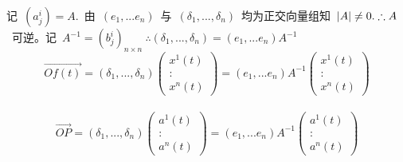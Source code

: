 记\ $(a_j^i)=A.$\ 由\ $(e_1,...e_n)$\ 与\ $(\delta_1,...,\delta_n)$\ 均为正交向量组知\  $|A|\neq 0.
\\
\therefore A$\ 可逆。记\ $A^{-1}=(b_j^i)_{n\times n}\ \therefore (\delta_1,...,\delta_n)=(e_1,...e_n)A^{-1}$
$$\overrightarrow{Of(t)}=(\delta_1,...,\delta_n)
                                           \left(        \begin{array}{c}
                                          x^1(t)
                                          \\
                                          \colon
                                          \\
                                          x^n(t)   
                                          \end{array}  \right)
                               =(e_1,...e_n)A^{-1} 
                                          \left(        \begin{array}{c}
                                          x^1(t)
                                          \\
                                          \colon
                                          \\
                                          x^n(t)   
                                          \end{array}  \right)
      $$
                    \\
                    $$
                      \overrightarrow{OP}=(\delta_1,...,\delta_n)
                                                              \left(        
                                                              \begin{array}{c}
                                                                 a^1(t)
                                                              \\
                                                              \colon
                                                              \\
                                                              a^n(t)   
                                                              \end{array}  
                                                              \right)
                                        =(e_1,...e_n)A^{-1}
                                                          \left(        
                                                         \begin{array}{c}
                                                         a^1(t)
                                                         \\
                                                         \colon
                                                         \\
                                                         a^n(t)   
                                                         \end{array}  
                                                         \right)   
$$
